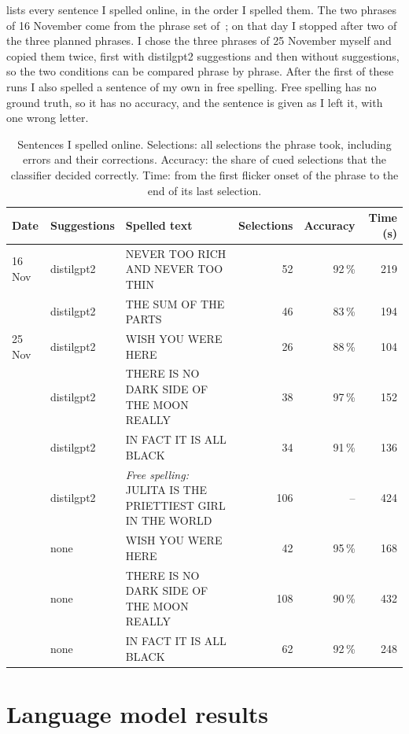  lists every sentence I spelled online, in the order I
spelled them. The two phrases of 16 November come from the phrase set
of~\citet{mackenzie2003phrase}; on that day I stopped after two of the three planned
phrases. I chose the three phrases of 25 November myself and copied them twice, first
with distilgpt2 suggestions and then without suggestions, so the two conditions can be
compared phrase by phrase. After the first of these runs I also spelled a sentence of my
own in free spelling. Free spelling has no ground truth, so it has no accuracy, and the
sentence is given as I left it, with one wrong letter.

\begin{table}[tb]
  \centering
  \caption{Sentences I spelled online. Selections: all selections the phrase took,
    including errors and their corrections. Accuracy: the share of cued selections
    that the classifier decided correctly. Time: from the first flicker onset of the
    phrase to the end of its last selection.}
  \label{tab:spelled-sentences}
  \small
  \begin{tabularx}{\textwidth}{@{}ll>{\raggedright\arraybackslash}Xrrr@{}}
    \toprule
    Date & Suggestions & Spelled text & Selections & Accuracy & Time (s) \\
    \midrule
    16 Nov & distilgpt2 & NEVER TOO RICH AND NEVER TOO THIN        & 52  & 92\,\% & 219 \\
           & distilgpt2 & THE SUM OF THE PARTS                     & 46  & 83\,\% & 194 \\
    \midrule
    25 Nov & distilgpt2 & WISH YOU WERE HERE                       & 26  & 88\,\% & 104 \\
           & distilgpt2 & THERE IS NO DARK SIDE OF THE MOON REALLY & 38  & 97\,\% & 152 \\
           & distilgpt2 & IN FACT IT IS ALL BLACK                  & 34  & 91\,\% & 136 \\
           & distilgpt2 & \textit{Free spelling:} JULITA IS THE PRIETTIEST GIRL IN THE WORLD
                                                                 & 106 & --     & 424 \\
    \addlinespace
           & none       & WISH YOU WERE HERE                       & 42  & 95\,\% & 168 \\
           & none       & THERE IS NO DARK SIDE OF THE MOON REALLY & 108 & 90\,\% & 432 \\
           & none       & IN FACT IT IS ALL BLACK                  & 62  & 92\,\% & 248 \\
    \bottomrule
  \end{tabularx}
\end{table}

\section{Language model results}
\label{sec:lm-results}
